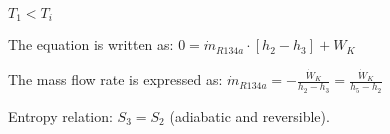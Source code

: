 \( T_1 < T_i \)  

The equation is written as:  
\( 0 = \dot{m}_{R134a} \cdot [h_2 - h_3] + W_K \)  

The mass flow rate is expressed as:  
\( \dot{m}_{R134a} = -\frac{\dot{W}_K}{h_2 - h_3} = \frac{\dot{W}_K}{h_5 - h_2} \)  

Entropy relation:  
\( S_3 = S_2 \) (adiabatic and reversible).